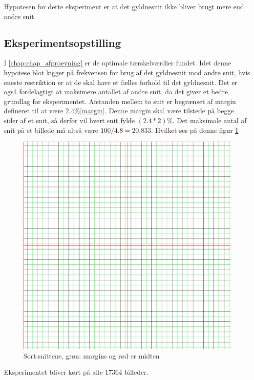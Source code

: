 {
Hypotesen for dette eksperiment er at det gyldnesnit ikke bliver brugt
mere end andre snit.
\subsection{Eksperimentsopstilling}
I \ref{chap:chap_afproevning} er de optimale tærskelværdier fundet.
Idet denne hypotese blot kigger på frekvensen for brug af det gyldnesnit
mod andre snit, hvis eneste restriktion er at de skal have et fælles
forhold til det gyldnesnit.
Det er også fordelagtigt at maksimere antallet af andre snit, da det
giver et bedre grundlag for eksperimentet.
Afstanden mellem to snit er begrænset af margin defineret til at være
$2.4\%$\ref{margin}. 
Denne margin skal være tilstede på begge sider af et snit, så derfor vil
hvert snit fylde $(2.4*2)\%$.
Det maksimale antal af snit på et billede må altså være
$100/4.8=20.833$. Hvilket ses på denne figur \ref{snitogmargin}
\begin{figure}[h!]
	\begin{center}
		\includegraphics[scale=0.3]{afsnit/resultater/billeder/20_cuts_med_margin}
	\end{center}
	\caption{Sort:snittene, grøn: margins og rød er midten}
	\label{snitogmargin}
\end{figure}

Eksperimentet bliver kørt på alle 17364 billeder.
\newpage
}
